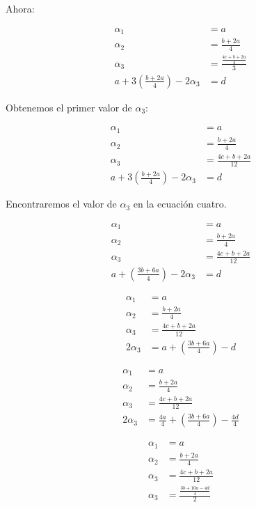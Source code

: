\documentclass[letterpaper]{article}
\renewcommand{\*}{\cdot}
\theoremstyle{definition}
\begin{document}
	Ahora:
	\begin{center}
		\begin{align*}
		\alpha_{1}&=a\\
		\alpha_{2}&=\frac{b+2a}{4}\\
		\alpha_{3}&=\frac{\frac{4c+b+2a}{4}}{3}\\
		a+3(\frac{b+2a}{4})-2\alpha_{3}&=d
		\end{align*}
	\end{center}
	Obtenemos el primer valor de $\alpha_{3}$: 
	\begin{center}
		\begin{align*}
		\alpha_{1}&=a\\
		\alpha_{2}&=\frac{b+2a}{4}\\
		\alpha_{3}&=\frac{4c+b+2a}{12}\\
		a+3(\frac{b+2a}{4})-2\alpha_{3}&=d
		\end{align*}
	\end{center}
	Encontraremos el valor de $\alpha_{3}$ en la ecuación cuatro.
	\begin{center}
		\begin{align*}
		\alpha_{1}&=a\\
		\alpha_{2}&=\frac{b+2a}{4}\\
		\alpha_{3}&=\frac{4c+b+2a}{12}\\
		a+(\frac{3b+6a}{4})-2\alpha_{3}&=d
		\end{align*}
	\end{center}
	\begin{center}
		\begin{align*}
		\alpha_{1}&=a\\
		\alpha_{2}&=\frac{b+2a}{4}\\
		\alpha_{3}&=\frac{4c+b+2a}{12}\\
		2\alpha_{3}&=a+(\frac{3b+6a}{4})-d
		\end{align*}
	\end{center}
	\begin{center}
		\begin{align*}
		\alpha_{1}&=a\\
		\alpha_{2}&=\frac{b+2a}{4}\\
		\alpha_{3}&=\frac{4c+b+2a}{12}\\
		2\alpha_{3}&=\frac{4a}{4}+(\frac{3b+6a}{4})-\frac{4d}{4}
		\end{align*}
	\end{center}
	\begin{center}
		\begin{align*}
		\alpha_{1}&=a\\
		\alpha_{2}&=\frac{b+2a}{4}\\
		\alpha_{3}&=\frac{4c+b+2a}{12}\\
		\alpha_{3}&=\frac{\frac{3b+10a-4d}{4}}{2}
		\end{align*}
	\end{center}
\end{document}

